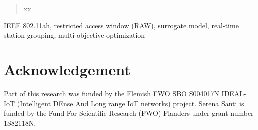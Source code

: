 \documentclass[review, 3p, 11pt]{elsarticle}
\begin{document}
\begin{frontmatter}

\begin{abstract}
xx
\end{abstract}

\begin{keyword}
IEEE 802.11ah, restricted access window (RAW), surrogate model, real-time station grouping, multi-objective optimization
\end{keyword}


\end{frontmatter}

\linenumbers

\glsresetall











\section*{Acknowledgement}
Part of this research was funded by the Flemish FWO SBO S004017N IDEAL-IoT (Intelligent DEnse And Long range IoT networks) project. Serena Santi is funded by the Fund For Scientific Research (FWO) Flanders under grant number 1S82118N.


%
%


%   





\end{document}
